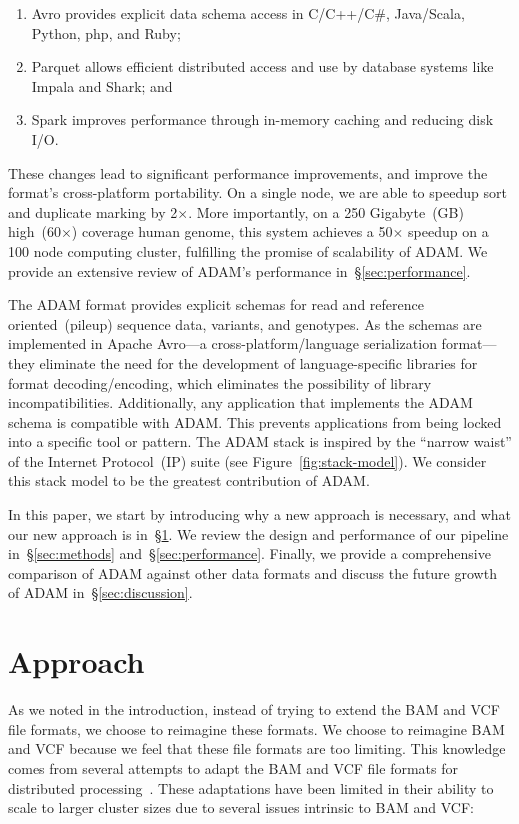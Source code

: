 \documentclass{bioinfo}
\begin{document}
\begin{enumerate}
\item Avro provides explicit data schema access in C/C++/C\#, Java/Scala, Python, php, and Ruby;
\item Parquet allows efficient distributed access and use by database systems like Impala and Shark; and 
\item Spark improves performance through in-memory caching and reducing disk I/O.
\end{enumerate}

These changes lead to significant performance improvements, and improve the format's cross-platform portability. On a single
node, we are able to speedup sort and duplicate marking by 2$\times$. More importantly, on a 250 Gigabyte~(GB) high~(60$\times$) coverage
human genome, this system achieves a 50$\times$ speedup on a 100 node computing cluster, fulfilling the promise of scalability of ADAM.
We provide an extensive review of ADAM's performance in~\S\ref{sec:performance}.

The ADAM format provides explicit schemas for read and reference oriented~(pileup) sequence data, variants, and genotypes. As the
schemas are implemented in Apache Avro---a cross-platform/language serialization format---they eliminate
the need for the development of language-specific libraries for format decoding/encoding, which eliminates the possibility of library
incompatibilities. Additionally, any application that implements the ADAM schema is compatible with ADAM. This prevents
applications from being locked into a specific tool or pattern. The ADAM stack is inspired by the ``narrow waist'' of the Internet Protocol~(IP)
suite (see Figure~\ref{fig:stack-model}). We consider this stack model to be the greatest contribution of ADAM.

In this paper, we start by introducing why a new approach is necessary, and what our new approach is in~\S\ref{sec:approach}. We review the
design and performance of our pipeline in~\S\ref{sec:methods} and~\S\ref{sec:performance}. Finally, we provide a comprehensive comparison of
ADAM against other data formats and discuss the future growth of ADAM in~\S\ref{sec:discussion}.

\section{Approach}
\label{sec:approach}

As we noted in the introduction, instead of trying to extend the BAM and VCF file formats, we choose to reimagine these formats. We choose
to reimagine BAM and VCF because we feel that these file formats are too limiting. This knowledge comes from several attempts to adapt the
BAM and VCF file formats for distributed processing~\citep{niemenmaa12}. These adaptations have been limited in their ability to scale to larger
cluster sizes due to several issues intrinsic to BAM and VCF:
\end{document}
